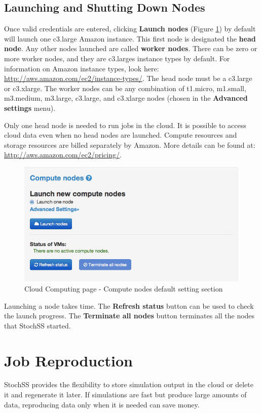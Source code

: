 \subsection{Launching and Shutting Down Nodes}
Once valid credentials are entered, clicking \textbf{Launch nodes} (Figure \ref{fig:2}) by default will launch one c3.large Amazon instance. This first node is designated the \textbf{head node}. Any other nodes launched are called \textbf{worker nodes}. There can be zero or more worker nodes, and they are c3.larges instance types by default. For information on Amazon instance types, look here: \url{http://aws.amazon.com/ec2/instance-types/}. The head node must be a c3.large or c3.xlarge. The worker nodes can be any combination of t1.micro, m1.small, m3.medium, m3.large, c3.large, and c3.xlarge nodes (chosen in the \textbf{Advanced settings} menu).

Only one head node is needed to run jobs in the cloud. It is possible to access cloud data even when no head nodes are launched. Compute resources and storage resources are billed separately by Amazon. More details can be found at: \url{http://aws.amazon.com/ec2/pricing/}.

\begin{figure}[!ht]
\centering
\includegraphics[scale=0.45]{T6/T6_fig_computenode1.png}
\caption{Cloud Computing page - Compute nodes default setting section}
\label{fig:2}
\end{figure}

Launching a node takes time. The \textbf{Refresh status} button can be used to check the launch progress. The \textbf{Terminate all nodes} button terminates all the nodes that StochSS started.

\section{Job Reproduction}
StochSS provides the flexibility to store simulation output in the cloud or delete it and regenerate it later. If simulations are fast but produce large amounts of data, reproducing data only when it is needed can save money.

